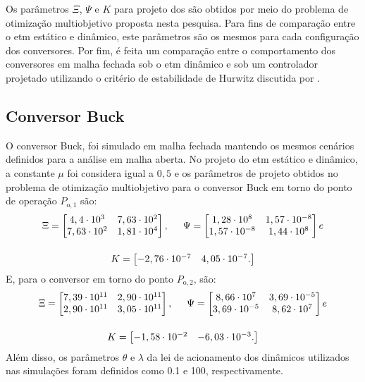 Os parâmetros $\Xi$, $\Psi$ e $K$ para projeto dos  são obtidos por meio do problema de otimização multiobjetivo proposta nesta pesquisa. Para fins de comparação entre o \acrshort{etm} estático e dinâmico, este parâmetros são os mesmos para cada configuração dos conversores. Por fim, é feita um comparação entre o comportamento dos conversores em malha fechada sob o \acrshort{etm} dinâmico e sob um controlador projetado utilizando o critério de estabilidade de Hurwitz discutida por \cite{Duan2013}.

\subsection{Conversor Buck}

O conversor Buck, foi simulado em malha fechada mantendo os mesmos cenários definidos para a análise em malha aberta. No projeto do \acrshort{etm} estático e dinâmico, a constante $\mu$ foi considera igual a $0,5$ e os parâmetros de projeto obtidos no problema de otimização multiobjetivo para o conversor Buck em torno do ponto de operação $P_{\mathrm{o}, 1}$ são: \begin{gather}
  \Xi = \begin{bmatrix}
    4,4 \cdot 10^3  & 7,63 \cdot 10^2 \\
    7,63 \cdot 10^2 & 1,81 \cdot 10^4 \\
  \end{bmatrix}, \hspace{.5cm}
  \Psi = \begin{bmatrix}
    1,28 \cdot 10^8    & 1,57 \cdot 10^{-8} \\
    1,57 \cdot 10^{-8} & 1,44 \cdot 10^8    \\
  \end{bmatrix} e \notag \\[12pt]
  K = \begin{bmatrix}
    -2,76 \cdot 10^{-7} & 4,05 \cdot 10^{-7}. \notag
  \end{bmatrix}
\end{gather} E, para o conversor em torno do ponto $P_{\mathrm{o}, 2}$, são: \begin{gather}
  \Xi = \begin{bmatrix}
    7,39 \cdot 10^{11} & 2,90 \cdot 10^{11} \\
    2,90 \cdot 10^{11} & 3,05 \cdot 10^{11} \\
  \end{bmatrix}, \hspace{.5cm}
  \Psi = \begin{bmatrix}
    8,66 \cdot 10^7    & 3,69 \cdot 10^{-5} \\
    3,69 \cdot 10^{-5} & 8,62 \cdot 10^7    \\
  \end{bmatrix} e \notag \\[12pt]
  K = \begin{bmatrix}
    -1,58 \cdot 10^{-2} & -6,03 \cdot 10^{-3}. \notag
  \end{bmatrix}
\end{gather} Além disso, os parâmetros $\theta$ e $\lambda$ da lei de acionamento dos  dinâmicos utilizados nas simulações foram definidos como 0.1 e 100, respectivamente.

